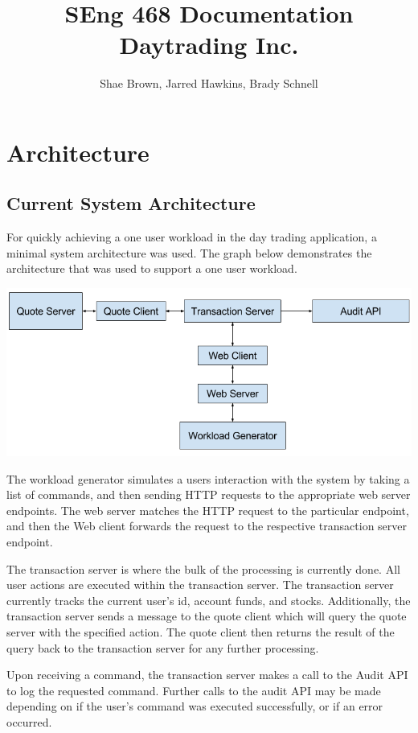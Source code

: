 \documentclass[a4paper,10pt]{article}
\title{SEng 468 Documentation\\Daytrading Inc.}
\author{Shae Brown, Jarred Hawkins, Brady Schnell}
\begin{document}
\maketitle

\tableofcontents

\section{Architecture}
\subsection{Current System Architecture}
For quickly achieving a one user workload in the day trading application, a 
minimal system architecture was used. The graph below demonstrates the 
architecture that was used to support a one user workload.

\includegraphics[width=\linewidth]{./arch.png}

The workload generator simulates a users interaction with the system by taking a 
list of commands, and then sending HTTP requests to the appropriate web server 
endpoints. The web server matches the HTTP request to the particular endpoint, 
and then the Web client forwards the request to the respective transaction 
server endpoint.

The transaction server is where the bulk of the processing is currently done. 
All user actions are executed within the transaction server. The transaction 
server currently tracks the current user's id, account funds, and stocks. 
Additionally, the transaction server sends a message to the quote client which 
will query the quote server with the specified action. The quote client then 
returns the result of the query back to the transaction server for any further 
processing.

Upon receiving a command, the transaction server makes a call to the Audit API 
to log the requested command. Further calls to the audit API may be made 
depending on if the user's command was executed successfully, or if an error 
occurred.
\end{document}
